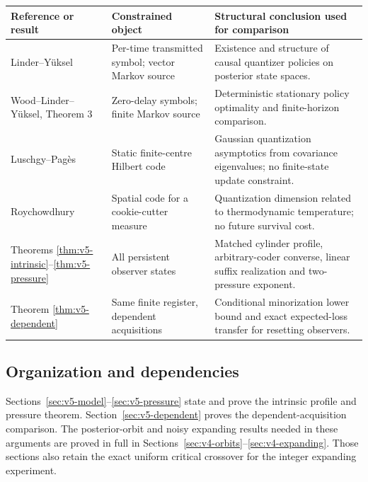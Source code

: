 \begin{center}
\small
\begin{tabular}{@{}p{}p{}p{}@{}}
\toprule
Reference or result & Constrained object & Structural conclusion used for comparison\\
\midrule
Linder--Y\"uksel & Per-time transmitted symbol; vector Markov source & Existence and structure of causal quantizer policies on posterior state spaces.\\[3pt]
Wood--Linder--Y\"uksel, Theorem 3 & Zero-delay symbols; finite Markov source & Deterministic stationary policy optimality and finite-horizon comparison.\\[3pt]
Luschgy--Pag\`es & Static finite-centre Hilbert code & Gaussian quantization asymptotics from covariance eigenvalues; no finite-state update constraint.\\[3pt]
Roychowdhury & Spatial code for a cookie-cutter measure & Quantization dimension related to thermodynamic temperature; no future survival cost.\\[3pt]
Theorems \ref{thm:v5-intrinsic}--\ref{thm:v5-pressure} & All persistent observer states & Matched cylinder profile, arbitrary-coder converse, linear suffix realization and two-pressure exponent.\\[3pt]
Theorem \ref{thm:v5-dependent} & Same finite register, dependent acquisitions & Conditional minorization lower bound and exact expected-loss transfer for resetting observers.\\
\bottomrule
\end{tabular}
\end{center}

\subsection{Organization and dependencies}
Sections~\ref{sec:v5-model}--\ref{sec:v5-pressure} state and prove
the intrinsic profile and pressure theorem. Section~\ref{sec:v5-dependent}
proves the dependent-acquisition comparison. The posterior-orbit
and noisy expanding results needed in these arguments are proved
in full in Sections~\ref{sec:v4-orbits}--\ref{sec:v4-expanding}.
Those sections also retain the exact uniform critical crossover for
the integer expanding experiment.

